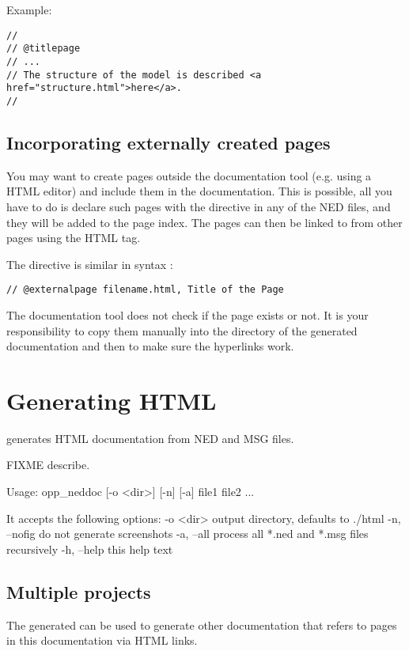 Example:
\begin{verbatim}
//
// @titlepage
// ...
// The structure of the model is described <a href="structure.html">here</a>.
//
\end{verbatim}


\subsection{Incorporating externally created pages}

You may want to create pages outside the documentation tool
(e.g. using a HTML editor) and include them in the documentation.
This is possible, all you have to do is declare such pages with
the  directive in any of the NED files, and
they will be added to the page index. The pages can then be linked to
from other pages using the HTML  tag.

The  directive is similar in syntax
:

\begin{verbatim}
// @externalpage filename.html, Title of the Page
\end{verbatim}

The documentation tool does not check if the page exists
or not. It is your responsibility to copy them manually into
the directory of the generated documentation and then to make
sure the hyperlinks work.



\section{Generating HTML}

 generates HTML documentation from NED and MSG files.

FIXME describe.

Usage: opp\_neddoc [-o <dir>] [-n] [-a] file1 file2 ...

It accepts the following options:
 -o <dir>      output directory, defaults to ./html
 -n, --nofig   do not generate screenshots
 -a, --all     process all *.ned and *.msg files recursively
 -h, --help    this help text



\subsection{Multiple projects}

The generated  can be used to generate other documentation
that refers to pages in this documentation via HTML links.



